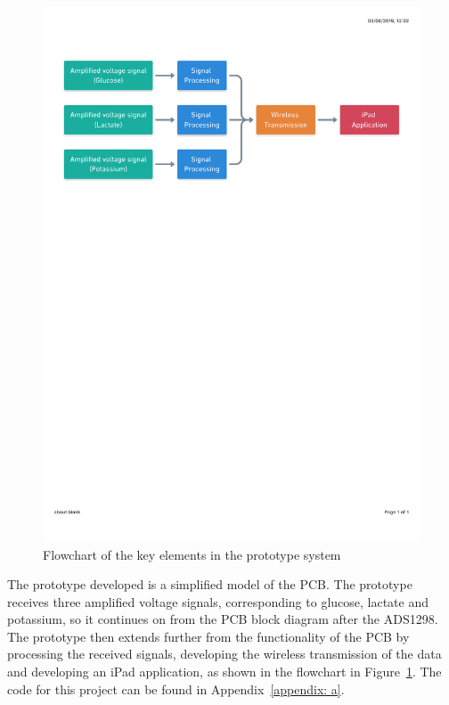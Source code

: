 \begin{figure}[b!]
\centering
\includegraphics[trim={0cm 19.5cm 0.5cm  2.5cm}, clip, width=1\textwidth]{./figures/Flowchart.pdf}
\captionsetup{justification=centering}
\caption{Flowchart of the key elements in the prototype system}
\label{fig: flowchart}
\end{figure}

The prototype developed is a simplified model of the PCB. The prototype receives three amplified voltage signals, corresponding to glucose, lactate and potassium, so it continues on from the PCB block diagram after the ADS1298. The prototype then extends further from the functionality of the PCB by processing the received signals, developing the wireless transmission of the data and developing an iPad application, as shown in the flowchart in Figure~\ref{fig: flowchart}. The code for this project can be found in Appendix~\ref{appendix: a}.




